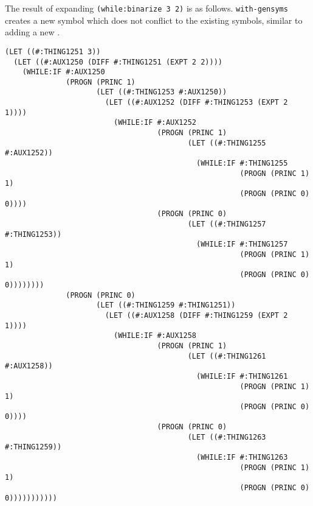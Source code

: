 \documentclass{article}
\begin{document}
The result of expanding \texttt{(while:binarize 3 2)} is as follows. \texttt{with-gensyms}
creates a new symbol which does not conflict to the existing symbols, similar to
adding a new .

\lstset{language=Lisp,label= ,caption= ,captionpos=b,numbers=none}
\begin{lstlisting}
(LET ((#:THING1251 3))
  (LET ((#:AUX1250 (DIFF #:THING1251 (EXPT 2 2))))
    (WHILE:IF #:AUX1250
              (PROGN (PRINC 1)
                     (LET ((#:THING1253 #:AUX1250))
                       (LET ((#:AUX1252 (DIFF #:THING1253 (EXPT 2 1))))
                         (WHILE:IF #:AUX1252
                                   (PROGN (PRINC 1)
                                          (LET ((#:THING1255 #:AUX1252))
                                            (WHILE:IF #:THING1255
                                                      (PROGN (PRINC 1) 1)
                                                      (PROGN (PRINC 0) 0))))
                                   (PROGN (PRINC 0)
                                          (LET ((#:THING1257 #:THING1253))
                                            (WHILE:IF #:THING1257
                                                      (PROGN (PRINC 1) 1)
                                                      (PROGN (PRINC 0) 0))))))))
              (PROGN (PRINC 0)
                     (LET ((#:THING1259 #:THING1251))
                       (LET ((#:AUX1258 (DIFF #:THING1259 (EXPT 2 1))))
                         (WHILE:IF #:AUX1258
                                   (PROGN (PRINC 1)
                                          (LET ((#:THING1261 #:AUX1258))
                                            (WHILE:IF #:THING1261
                                                      (PROGN (PRINC 1) 1)
                                                      (PROGN (PRINC 0) 0))))
                                   (PROGN (PRINC 0)
                                          (LET ((#:THING1263 #:THING1259))
                                            (WHILE:IF #:THING1263
                                                      (PROGN (PRINC 1) 1)
                                                      (PROGN (PRINC 0) 0)))))))))))
\end{lstlisting}
\end{document}
